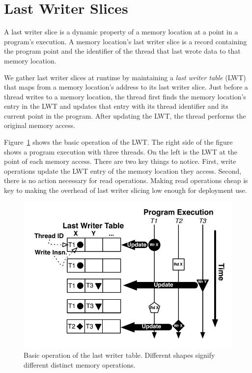 \documentclass[preprint,9pt]{sigplanconf}
\newcommand{\lwt}{LWT\xspace}
\begin{document}
\section{Last Writer Slices}
\label{sec:lastwriterslices}
A last writer slice is a dynamic property of a memory location at a point in a
program's execution.   A memory location's last writer slice is a record
containing the program point and the identifier of the thread that last wrote
data to that memory location.  


We gather last writer slices at runtime by maintaining a {\em last writer
table} (\lwt) that maps from a memory location's address to its last writer
slice.  Just before a thread writes to a memory location, the thread first
finds the memory location's entry in the \lwt and updates that entry with its
thread identifier and its current point in the program.  After updating the
\lwt, the thread performs the original memory access.  


Figure~\ref{fig:basicLWT} shows the basic operation of the \lwt.  The right
side of the figure shows a program execution with three threads.  On the left
is the \lwt at the point of each memory access.  There are two key things to
notice.  First, write operations update the \lwt entry of the memory location
they access.  Second, there is no action necessary for read operations.
Making read operations cheap is key to making the overhead of last writer
slicing low enough for deployment use.


\begin{figure}[h]
\centering
\includegraphics[scale=.6]{figs/BasicLWT.pdf}
\caption{\label{fig:basicLWT}Basic operation of the last writer table. Different shapes signify different distinct memory operations. }
\end{figure}
\end{document}

